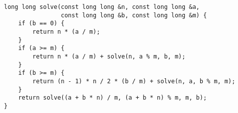 \begin{lstlisting}
long long solve(const long long &n, const long long &a,
                const long long &b, const long long &m) {
    if (b == 0) {
        return n * (a / m);
    }
    if (a >= m) {
        return n * (a / m) + solve(n, a % m, b, m);
    }
    if (b >= m) {
        return (n - 1) * n / 2 * (b / m) + solve(n, a, b % m, m);
    }
    return solve((a + b * n) / m, (a + b * n) % m, m, b);
}
\end{lstlisting}
